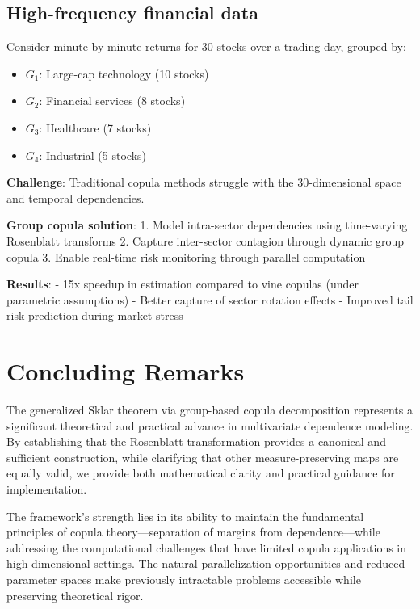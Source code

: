 \subsection{High-frequency financial data}
\begin{example}
Consider minute-by-minute returns for 30 stocks over a trading day, grouped by:
\begin{itemize}
    \item $G_1$: Large-cap technology (10 stocks)
    \item $G_2$: Financial services (8 stocks)
    \item $G_3$: Healthcare (7 stocks)
    \item $G_4$: Industrial (5 stocks)
\end{itemize}
\textbf{Challenge}: Traditional copula methods struggle with the 30-dimensional space and temporal dependencies.

\textbf{Group copula solution}:
1. Model intra-sector dependencies using time-varying Rosenblatt transforms
2. Capture inter-sector contagion through dynamic group copula
3. Enable real-time risk monitoring through parallel computation

\textbf{Results}:
- 15x speedup in estimation compared to vine copulas (under parametric assumptions)
- Better capture of sector rotation effects
- Improved tail risk prediction during market stress
\end{example}

\section{Concluding Remarks}
The generalized Sklar theorem via group-based copula decomposition represents a significant theoretical and practical advance in multivariate dependence modeling. By establishing that the Rosenblatt transformation provides a canonical and sufficient construction, while clarifying that other measure-preserving maps are equally valid, we provide both mathematical clarity and practical guidance for implementation.

The framework's strength lies in its ability to maintain the fundamental principles of copula theory—separation of margins from dependence—while addressing the computational challenges that have limited copula applications in high-dimensional settings. The natural parallelization opportunities and reduced parameter spaces make previously intractable problems accessible while preserving theoretical rigor.

